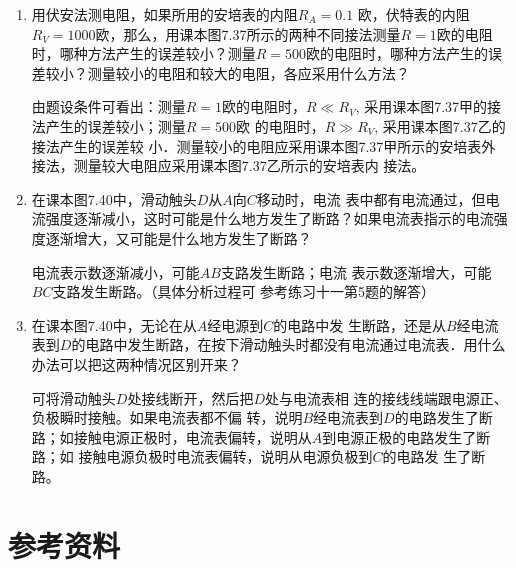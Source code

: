 \begin{enumerate}
\begin{solution}
\end{solution}

\item 用伏安法测电阻，如果所用的安培表的内阻$R_A=0.1$
欧，伏特表的内阻$R_V=1000$欧，那么，用课本图7.37所示的两种不同接法测量$R=1$欧的电阻时，哪种方法产生的误差较小？测量$R=500$欧的电阻时，哪种方法产生的误差较小？测量较小的电阻和较大的电阻，各应采用什么方法？

\begin{solution}
    由题设条件可看出：测量$R=1$欧的电阻时，$R\ll R_V$,
    采用课本图7.37甲的接法产生的误差较小；测量$R=500$欧
    的电阻时，$R\gg R_V$, 采用课本图7.37乙的接法产生的误差较
    小．测量较小的电阻应采用课本图7.37甲所示的安培表外
    接法，测量较大电阻应采用课本图7.37乙所示的安培表内
    接法。
\end{solution}

\item 在课本图7.40中，滑动触头$D$从$A$向$C$移动时，电流
表中都有电流通过，但电流强度逐渐减小，这时可能是什么地方发生了断路？如果电流表指示的电流强度逐渐增大，又可能是什么地方发生了断路？

\begin{solution}
    电流表示数逐渐减小，可能$AB$支路发生断路；电流
    表示数逐渐增大，可能$BC$支路发生断路。（具体分析过程可
    参考练习十一第5题的解答）
\end{solution}

\item 在课本图7.40中，无论在从$A$经电源到$C$的电路中发
生断路，还是从$B$经电流表到$D$的电路中发生断路，在按下滑动触头时都没有电流通过电流表．用什么办法可以把这两种情况区别开来？

\begin{solution}
    可将滑动触头$D$处接线断开，然后把$D$处与电流表相
    连的接线线端跟电源正、负极瞬时接触。如果电流表都不偏
    转，说明$B$经电流表到$D$的电路发生了断路；如接触电源正极时，电流表偏转，说明从$A$到电源正极的电路发生了断路；如
    接触电源负极时电流表偏转，说明从电源负极到$C$的电路发
    生了断路。
\end{solution}

\end{enumerate}



\section{参考资料}
